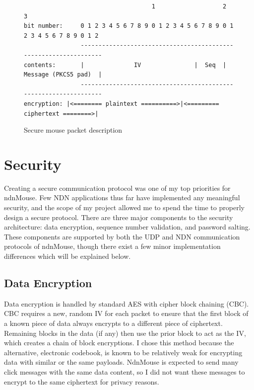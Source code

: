 \documentclass{sig-alternate}
\renewcommand\_{\textunderscore\allowbreak}  %
\begin{document}
\begin{figure}
	\hypertarget{fig:mousePacketDescription}{}
\begin{lstlisting}
                                    1                   2                   3
bit number:     0 1 2 3 4 5 6 7 8 9 0 1 2 3 4 5 6 7 8 9 0 1 2 3 4 5 6 7 8 9 0 1 2
                -----------------------------------------------------------------
contents:       |              IV               |  Seq  |  Message (PKCS5 pad)  |
                -----------------------------------------------------------------
encryption:	|<======== plaintext ==========>|<========= ciphertext ========>|
\end{lstlisting}
\caption{Secure mouse packet description}
\end{figure}

\section{Security}
Creating a secure communication protocol was one of my top priorities for ndnMouse. Few NDN applications thus far have implemented any meaningful security, and the scope of my project allowed me to spend the time to properly design a secure protocol. There are three major components to the security architecture: data encryption, sequence number validation, and password salting. These components are supported by both the UDP and NDN communication protocols of ndnMouse, though there exist a few minor implementation differences which will be explained below.

\subsection{Data Encryption}
Data encryption is handled by standard AES with cipher block chaining (CBC). CBC requires a new, random IV for each packet to ensure that the first block of a known piece of data always encrypts to a different piece of ciphertext. Remaining blocks in the data (if any) then use the prior block to act as the IV, which creates a chain of block encryptions. I chose this method because the alternative, electronic codebook, is known to be relatively weak for encrypting data with similar or the same payloads. NdnMouse is expected to send many click messages with the same data content, so I did not want these messages to encrypt to the same ciphertext for privacy reasons. 
\end{document}

